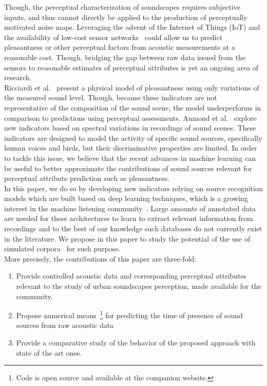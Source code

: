 \documentclass[11pt,a4paper]{article}
\begin{document}
Though, the perceptual characterization of soundscapes requires subjective inputs, and thus cannot directly be applied to the production of perceptually motivated noise maps. Leveraging the advent of the Internet of Things (IoT) and the availability of low-cost sensor networks~\cite{ardouin2018, mydlarz2017} could allow us to predict pleasantness or other perceptual factors from acoustic measurements at a reasonable cost. Though, bridging the gap between raw data issued from the sensors to reasonable estimates of perceptual attributes is yet an ongoing area of research.\\

Ricciardi et al.~\cite{ricciardi2014} present a physical model of pleasantness using only variations of the measured sound level. Though, because these indicators are not representative of the composition of the sound scene, the model underperforms in comparison to predictions using perceptual assessments. Aumond et al.~\cite{aumond2017} explore new indicators based on spectral variations in recordings of sound scenes. These indicators are designed to model the activity of specific sound sources, specifically human voices and birds, but their discriminative properties are limited. In order to tackle this issue, we believe that the recent advances in machine learning can be useful to better approximate the contributions of sound sources relevant for perceptual attribute prediction such as pleasantness.\\

In this paper, we do so by developing new indicators relying on source recognition models which are built based on deep learning techniques, which is a growing interest in the machine listening community~\cite{cakir2015, salamon2017-2}. Large amounts of annotated data are needed for these architectures to learn to extract relevant information from recordings and to the best of our knowledge such databases do not currently exist in the literature. We propose in this paper to study the potential of the use of simulated corpora~\cite{rossignol2015, salamon2017} for such purpose.\\

More precisely, the contributions of this paper are three-fold:
\begin{enumerate}
  \item Provide controlled acoustic data and corresponding perceptual attributes relevant to the study of urban soundscapes perception, made available for the community.
  \item Propose numerical means~\footnote{Code is open source and available at the companion website.} for predicting the time of presence of sound sources from raw acoustic data
  \item Provide a comparative study of the behavior of the proposed approach with state of the art ones.
\end{enumerate}
\end{document}
